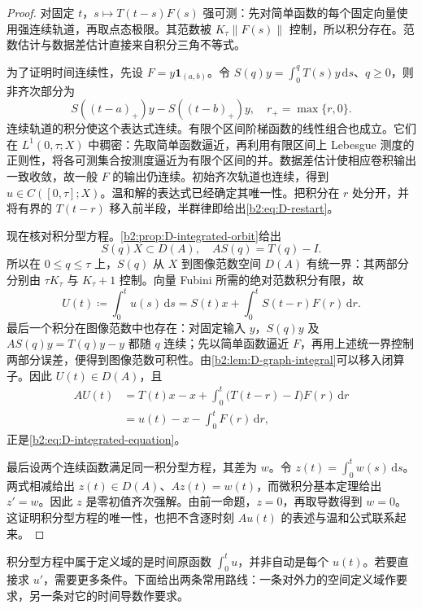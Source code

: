 \begin{proof}
对固定 \(t\)，\(s\mapsto T(t-s)F(s)\) 强可测：先对简单函数的每个固定向量使用强连续轨道，再取点态极限。其范数被 \(K_\tau\|F(s)\|\) 控制，所以积分存在。范数估计与数据差估计直接来自积分三角不等式。

为了证明时间连续性，先设 \(F=y\mathbf1_{(a,b)}\)。令
\(S(q)y=\int_0^qT(s)y\,\mathrm ds\)、\(q\geq0\)，则非齐次部分为
\[
 S((t-a)_+)y-S((t-b)_+)y,
 \quad r_+=\max\{r,0\}.
\]
连续轨道的积分使这个表达式连续。有限个区间阶梯函数的线性组合也成立。它们在 \(L^1(0,\tau;X)\) 中稠密：先取简单函数逼近，再利用有限区间上 Lebesgue 测度的正则性，将各可测集合按测度逼近为有限个区间的并。数据差估计使相应卷积输出一致收敛，故一般 \(F\) 的输出仍连续。初始齐次轨道也连续，得到 \(u\in C([0,\tau];X)\)。温和解的表达式已经确定其唯一性。把积分在 \(r\) 处分开，并将有界的 \(T(t-r)\) 移入前半段，半群律即给出\eqref{b2:eq:D-restart}。

现在核对积分型方程。\cref{b2:prop:D-integrated-orbit}给出
\[
 S(q)X\subset D(A),\quad AS(q)=T(q)-I.
\]
所以在 \(0\leq q\leq\tau\) 上，\(S(q)\) 从 \(X\) 到图像范数空间 \(D(A)\) 有统一界：其两部分分别由 \(\tau K_\tau\) 与 \(K_\tau+1\) 控制。向量 Fubini 所需的绝对范数积分有限，故
\[
 U(t)\coloneqq\int_0^tu(s)\,\mathrm ds
 =S(t)x+\int_0^tS(t-r)F(r)\,\mathrm dr.
\]
最后一个积分在图像范数中也存在：对固定输入 \(y\)，\(S(q)y\) 及 \(AS(q)y=T(q)y-y\) 都随 \(q\) 连续；先以简单函数逼近 \(F\)，再用上述统一界控制两部分误差，便得到图像范数可积性。由\cref{b2:lem:D-graph-integral}可以移入闭算子。因此 \(U(t)\in D(A)\)，且
\[
 \begin{aligned}
 AU(t)
 &=T(t)x-x+\int_0^t\bigl(T(t-r)-I\bigr)F(r)\,\mathrm dr\\
 &=u(t)-x-\int_0^tF(r)\,\mathrm dr,
 \end{aligned}
\]
正是\eqref{b2:eq:D-integrated-equation}。

最后设两个连续函数满足同一积分型方程，其差为 \(w\)。令
\(z(t)=\int_0^tw(s)\,\mathrm ds\)。两式相减给出 \(z(t)\in D(A)\)、\(Az(t)=w(t)\)，而微积分基本定理给出 \(z'=w\)。因此 \(z\) 是零初值齐次强解。由前一命题，\(z=0\)，再取导数得到 \(w=0\)。这证明积分型方程的唯一性，也把不含逐时刻 \(Au(t)\) 的表述与温和公式联系起来。
\end{proof}

积分型方程中属于定义域的是时间原函数 \(\int_0^tu\)，并非自动是每个 \(u(t)\)。若要直接求 \(u'\)，需要更多条件。下面给出两条常用路线：一条对外力的空间定义域作要求，另一条对它的时间导数作要求。


